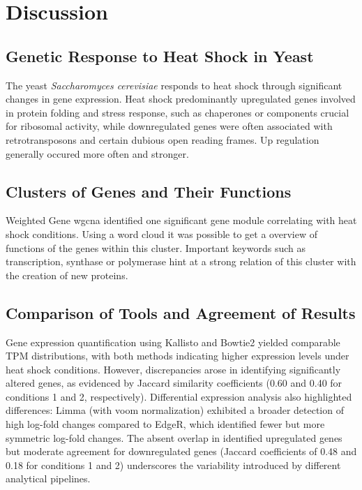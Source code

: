 \chapter{Discussion}

\section{Genetic Response to Heat Shock in Yeast}

The yeast \textit{Saccharomyces cerevisiae} responds to heat shock 
through significant changes in gene expression. Heat shock predominantly 
upregulated genes involved in protein folding and stress response, 
such as chaperones or components crucial for ribosomal activity, 
while downregulated genes were often associated 
with retrotransposons and certain dubious open reading frames. Up regulation 
generally occured more often and stronger.

\section{Clusters of Genes and Their Functions}

Weighted Gene \gls{wgcna} identified 
one significant gene module correlating with heat shock conditions. 
Using a word cloud it was possible to get a overview of functions 
of the genes within this cluster. Important keywords such as transcription, 
synthase or polymerase hint at a strong relation of this cluster with 
the creation of new proteins.

\section{Comparison of Tools and Agreement of Results}

Gene expression quantification using Kallisto and Bowtie2 yielded 
comparable TPM distributions, with both methods indicating higher 
expression levels under heat shock conditions. However, discrepancies 
arose in identifying significantly altered genes, as evidenced by Jaccard 
similarity coefficients (0.60 and 0.40 for conditions 1 and 2, 
respectively). Differential expression analysis also highlighted 
differences: Limma (with voom normalization) exhibited a broader 
detection of high log-fold changes compared to EdgeR, which identified 
fewer but more symmetric log-fold changes. The absent overlap in identified 
upregulated genes but moderate agreement for downregulated genes 
(Jaccard coefficients of 0.48 and 0.18 for conditions 1 and 2) underscores 
the variability introduced by different analytical pipelines. 
